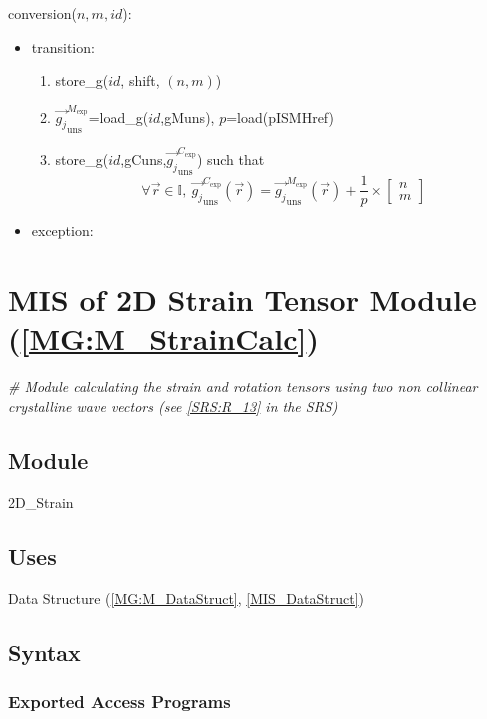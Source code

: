 \documentclass[12pt, titlepage]{article}
\begin{document}
\noindent conversion($n,m,id$):
\begin{itemize}
\item transition: 
	\begin{enumerate}
\item store{\_}g($id$, shift, $(n,m)$)
\item 
$\overrightarrow{g_{j}}_{\text{uns}}^{M_{\text{exp}}}$=load{\_}g($id$,gMuns), 
$p$=load(pISMHref)
\item 
store{\_}g($id$,gCuns,$\overrightarrow{g_{j}}_{\text{uns}}^{C_{\text{exp}}}$) 
such that
		\begin{equation*}
		\forall \vec{r} \in \mathbb{I}, \ 
\overrightarrow{g_{j}}_{\text{uns}}^{C_{\text{exp}}}(\vec{r})= 
\overrightarrow{g_{j}}_{\text{uns}}^{M_{\text{exp}}}(\vec{r}) + \frac{1}{p} 
\times \begin{bmatrix}
	n \\
	m
	\end{bmatrix}
		\end{equation*}
		\end{enumerate}
\item exception:
\end{itemize}

\section{MIS of 2D Strain Tensor Module 
(\texorpdfstring{\cref{MG:M_StrainCalc}}))} \label{MIS_StrainCalc}

\noindent\textit{{\#} Module calculating the strain and rotation tensors using 
two non collinear crystalline wave vectors (see \cref{SRS:R_13} in the SRS)}

\subsection{Module}
2D{\_}Strain
\subsection{Uses}
Data Structure (\cref{MG:M_DataStruct}, \cref{MIS_DataStruct})
\subsection{Syntax}

\subsubsection{Exported Access Programs}
\end{document}
